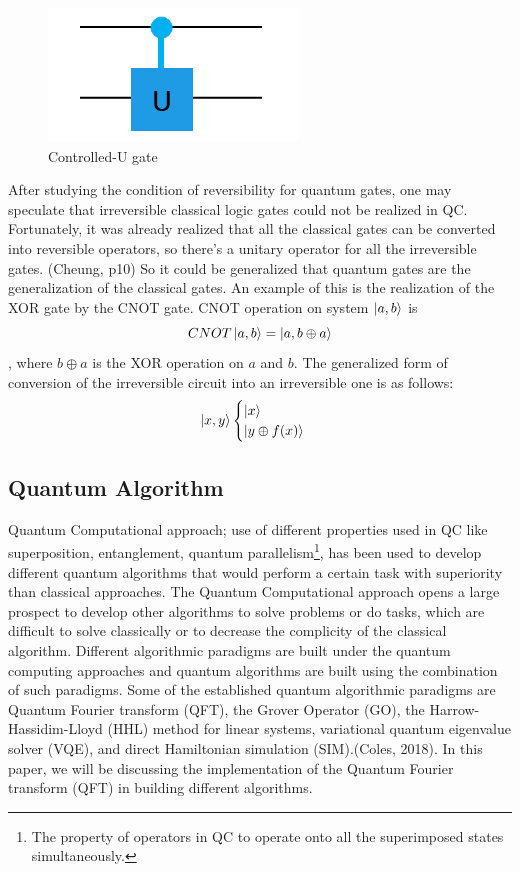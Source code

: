 \begin{figure}[H]
    \centering
    \includegraphics{figures/controlled_U.PNG} 
    \caption{Controlled-U gate}
    \label{fig: Controlled_U}
\end{figure}

After studying the condition of reversibility for quantum gates, one may speculate that irreversible classical logic gates could not be realized in \acrshort{QC}. Fortunately, it was already realized that all the classical gates can be converted into reversible operators, so there's a unitary operator for all the irreversible gates. \cite{Cheung} (Cheung, p10) So it could be generalized that quantum gates are the generalization of the classical gates. An example of this is the realization of the XOR gate by the CNOT gate. CNOT operation on system $\ket{a,b}$ is $$CNOT\ket{a,b} = \ket{a,b \oplus a}$$, where $b \oplus a$ is the XOR operation on $a$ and $b$. The generalized form of conversion of the irreversible circuit into an irreversible one is as follows:
\begin{equation}
		\ket{x,y}
        \begin{cases}
        	\ket{x} \\
            \ket{y \oplus f(x)}
        \end{cases}
\end{equation}

\subsection{Quantum Algorithm}
Quantum Computational approach; use of different properties used in \acrshort{QC} like superposition, entanglement, quantum parallelism\footnote{The property of operators in \acrshort{QC} to operate onto all the superimposed states simultaneously.\cite{neven2012}}, has been used to develop different quantum algorithms that would perform a certain task with superiority than classical approaches. The Quantum Computational approach opens a large prospect to develop other algorithms to solve problems or do tasks, which are difficult to solve classically or to decrease the complicity of the classical algorithm. Different algorithmic paradigms are built under the quantum computing approaches and quantum algorithms are built using the combination of such paradigms. Some of the established quantum algorithmic paradigms are Quantum Fourier transform (QFT), the Grover Operator (GO), the Harrow-Hassidim-Lloyd (HHL) method for linear systems, variational quantum eigenvalue solver (VQE), and direct Hamiltonian simulation (SIM).\cite{coles2018}(Coles, 2018). In this paper, we will be discussing the implementation of the Quantum Fourier transform (QFT) in building different algorithms.

